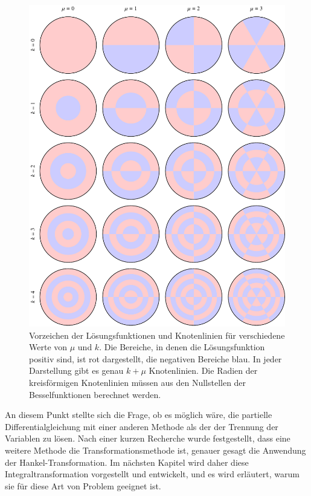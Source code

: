 \begin{figure}
	\centering
	\includegraphics[width=\textwidth]{chapters/090-pde/bessel/pauke.pdf}
	\caption{Vorzeichen der Lösungsfunktionen und Knotenlinien
		für verschiedene Werte von $\mu$ und $k$.
		Die Bereiche, in denen die Lösungsfunktion positiv sind, ist 
		rot dargestellt, die negativen Bereiche blau.
		In jeder Darstellung gibt es genau $k+\mu$ Knotenlinien.
		Die Radien der kreisförmigen Knotenlinien müssen aus den Nullstellen
		der Besselfunktionen berechnet werden.
		\label{buch:pde:kreis:fig:pauke}}
\end{figure}


An diesem Punkt stellte sich die Frage, ob es möglich wäre, die partielle Differentialgleichung mit einer anderen Methode als der der Trennung der Variablen zu lösen. Nach einer kurzen Recherche wurde festgestellt, dass eine weitere Methode die Transformationsmethode ist, genauer gesagt die Anwendung der Hankel-Transformation. Im nächsten Kapitel wird daher diese Integraltransformation vorgestellt und entwickelt, und es wird erläutert, warum sie für diese Art von Problem geeignet ist.
